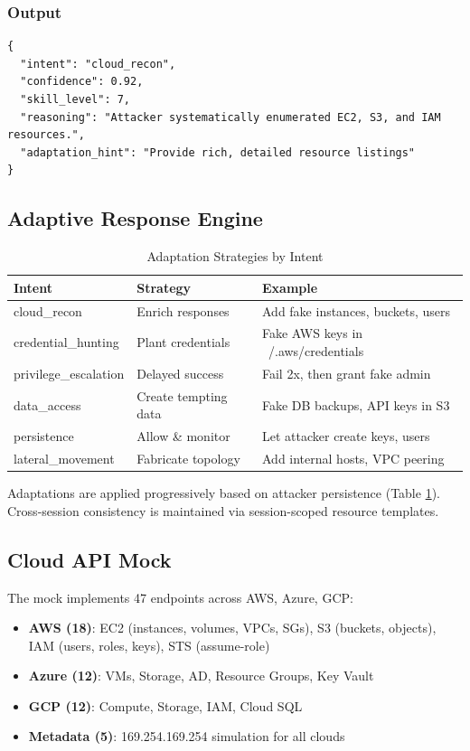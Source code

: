 \documentclass[10pt,conference]{IEEEtran}
\begin{document}
\subsubsection{Output}
\begin{verbatim}
{
  "intent": "cloud_recon",
  "confidence": 0.92,
  "skill_level": 7,
  "reasoning": "Attacker systematically enumerated EC2, S3, and IAM resources.",
  "adaptation_hint": "Provide rich, detailed resource listings"
}
\end{verbatim}

\subsection{Adaptive Response Engine}
\label{sec:adaptive}

\begin{table}[htbp]
\centering
\caption{Adaptation Strategies by Intent}
\label{tab:adapt}
\begin{tabular}{@{}lll@{}}
\toprule
\textbf{Intent} & \textbf{Strategy} & \textbf{Example} \\
\midrule
cloud\_recon & Enrich responses & Add fake instances, buckets, users \\
credential\_hunting & Plant credentials & Fake AWS keys in ~/.aws/credentials \\
privilege\_escalation & Delayed success & Fail 2x, then grant fake admin \\
data\_access & Create tempting data & Fake DB backups, API keys in S3 \\
persistence & Allow \& monitor & Let attacker create keys, users \\
lateral\_movement & Fabricate topology & Add internal hosts, VPC peering \\
\bottomrule
\end{tabular}
\end{table}

Adaptations are applied progressively based on attacker persistence (Table \ref{tab:adapt}).
Cross-session consistency is maintained via session-scoped resource templates.

\subsection{Cloud API Mock}
\label{sec:cloudmock}

The mock implements 47 endpoints across AWS, Azure, GCP:

\begin{itemize}
    \item \textbf{AWS (18)}: EC2 (instances, volumes, VPCs, SGs), S3 (buckets, objects), IAM (users, roles, keys), STS (assume-role)
    \item \textbf{Azure (12)}: VMs, Storage, AD, Resource Groups, Key Vault
    \item \textbf{GCP (12)}: Compute, Storage, IAM, Cloud SQL
    \item \textbf{Metadata (5)}: 169.254.169.254 simulation for all clouds
\end{itemize}
\end{document}
